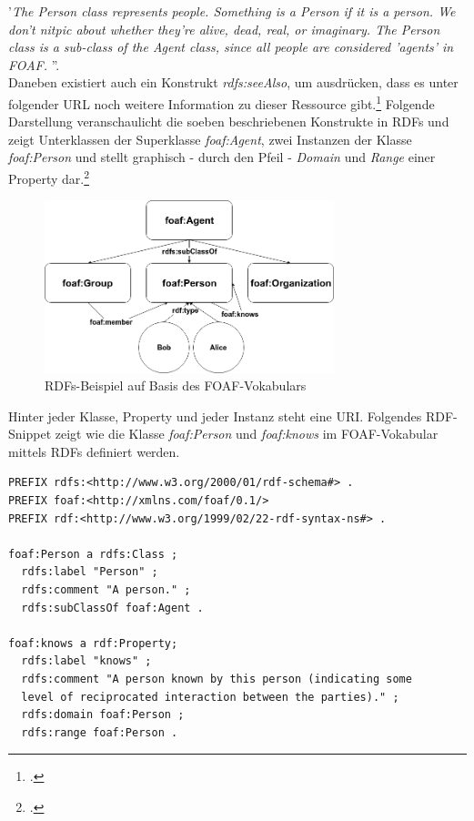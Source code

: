 \documentclass[12pt,a4paper]{article}
\begin{document}
'\textit{The Person class represents people. Something is a Person if it is a person. We don't nitpic about whether they're alive, dead, real, or imaginary. The Person class is a sub-class of the Agent class, since all people are considered 'agents' in FOAF. }''.\\
Daneben existiert auch ein Konstrukt \textit{rdfs:seeAlso}, um ausdrücken, dass es unter folgender URL noch weitere Information zu dieser Ressource gibt.\footcite{brickley2014rdf} Folgende Darstellung veranschaulicht die soeben beschriebenen Konstrukte in RDFs und zeigt Unterklassen der Superklasse \textit{foaf:Agent}, zwei Instanzen der Klasse \textit{foaf:Person} und stellt graphisch - durch den Pfeil - \textit{Domain} und \textit{Range} einer Property dar.\footcite[][S.33-88]{hitzler2007semantic}  
\begin{figure}[H]
  \centering
	\includegraphics[width=0.75\textwidth]{img/rdfs.png}  
    \caption[RDFs-Beispiel auf Basis des FOAF-Vokabulars, eigene Darstellung.]{RDFs-Beispiel auf Basis des FOAF-Vokabulars}
  	\label{fig:rdf}
\end{figure}
Hinter jeder Klasse, Property und jeder Instanz steht eine URI. Folgendes RDF-Snippet zeigt wie die Klasse \textit{foaf:Person} und \textit{foaf:knows} im FOAF-Vokabular mittels RDFs definiert werden.
\begin{lstlisting}[]
PREFIX rdfs:<http://www.w3.org/2000/01/rdf-schema#> .
PREFIX foaf:<http://xmlns.com/foaf/0.1/>
PREFIX rdf:<http://www.w3.org/1999/02/22-rdf-syntax-ns#> .

foaf:Person a rdfs:Class ;
  rdfs:label "Person" ;
  rdfs:comment "A person." ;
  rdfs:subClassOf foaf:Agent .
  
foaf:knows a rdf:Property;
  rdfs:label "knows" ;
  rdfs:comment "A person known by this person (indicating some 
  level of reciprocated interaction between the parties)." ;
  rdfs:domain foaf:Person ;
  rdfs:range foaf:Person .
\end{lstlisting}
\end{document}

